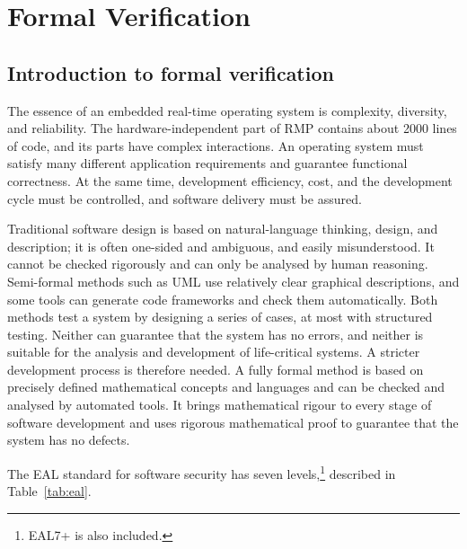 \chapter{Formal Verification}\label{ch:verification}

\section{Introduction to formal verification}

The essence of an embedded real-time operating system is complexity, diversity, and reliability.
The hardware-independent part of RMP contains about 2000 lines of code, and its parts have complex interactions.
An operating system must satisfy many different application requirements and guarantee functional correctness.
At the same time, development efficiency, cost, and the development cycle must be controlled, and software delivery must be assured.

Traditional software design is based on natural-language thinking, design, and description; it is often one-sided and ambiguous, and easily misunderstood.
It cannot be checked rigorously and can only be analysed by human reasoning.
Semi-formal methods such as UML use relatively clear graphical descriptions, and some tools can generate code frameworks and check them automatically.
Both methods test a system by designing a series of cases, at most with structured testing.
Neither can guarantee that the system has no errors, and neither is suitable for the analysis and development of life-critical systems.
A stricter development process is therefore needed.
A fully formal method is based on precisely defined mathematical concepts and languages and can be checked and analysed by automated tools.
It brings mathematical rigour to every stage of software development and uses rigorous mathematical proof to guarantee that the system has no defects.

The EAL standard for software security has seven levels,\footnote{EAL7+ is also included.} described in Table~\ref{tab:eal}.

